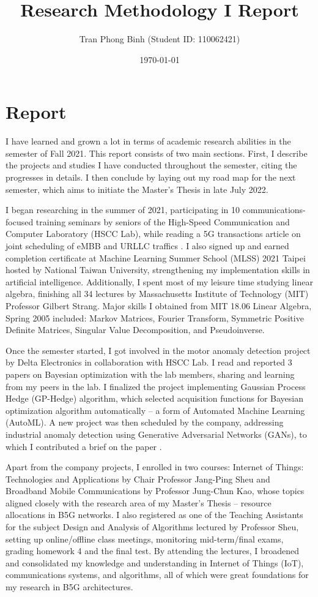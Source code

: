 \documentclass[12pt, a4paper, onside]{article}
\title{\textbf{Research Methodology I Report}}
\author{Tran Phong Binh (Student ID: 110062421)}
\affil{Advisor: Chair Professor Jang-Ping Sheu}
\date{\today}
\begin{document}
\maketitle

\section{Report}
I have learned and grown a lot in terms of academic research abilities in the semester of Fall 2021. This report consists of two main sections. First, I describe the projects and studies I have conducted throughout the semester, citing the progresses in details. I then conclude by laying out my road map for the next semester, which aims to initiate the Master's Thesis in late July 2022.

I began researching in the summer of 2021, participating in 10 communications-focused training seminars by seniors of the High-Speed Communication and Computer Laboratory (HSCC Lab), while reading a 5G transactions article on joint scheduling of eMBB and URLLC traffics \cite{5gJointACM}. I also signed up and earned completion certificate at Machine Learning Summer School (MLSS) 2021 Taipei hosted by National Taiwan University, strengthening my implementation skills in artificial intelligence. Additionally, I spent most of my leisure time studying linear algebra, finishing all 34 lectures by Massachusetts Institute of Technology (MIT) Professor Gilbert Strang. Major skills I obtained from MIT 18.06 Linear Algebra, Spring 2005 included: Markov Matrices, Fourier Transform, Symmetric Positive Definite Matrices, Singular Value Decomposition, and Pseudoinverse.

Once the semester started, I got involved in the motor anomaly detection project by Delta Electronics in collaboration with HSCC Lab. I read and reported 3 papers on Bayesian optimization \cite{bayesPortfolio, bayesSearch, bayesBandit} with the lab members, sharing and learning from my peers in the lab. I finalized the project implementing Gaussian Process Hedge (GP-Hedge) algorithm, which selected acquisition functions for Bayesian optimization algorithm automatically -- a form of Automated Machine Learning (AutoML). A new project was then scheduled by the company, addressing industrial anomaly detection using Generative Adversarial Networks (GANs), to which I contributed a brief on the paper \cite{efficientGAN}.

Apart from the company projects, I enrolled in two courses: Internet of Things: Technologies and Applications by Chair Professor Jang-Ping Sheu and Broadband Mobile Communications by Professor Jung-Chun Kao, whose topics aligned closely with the research area of my Master's Thesis -- resource allocations in B5G networks. I also registered as one of the Teaching Assistants for the subject Design and Analysis of Algorithms lectured by Professor Sheu, setting up online/offline class meetings, monitoring mid-term/final exams, grading homework 4 and the final test. By attending the lectures, I broadened and consolidated my knowledge and understanding in Internet of Things (IoT), communications systems, and algorithms, all of which were great foundations for my research in B5G architectures.
\end{document}
